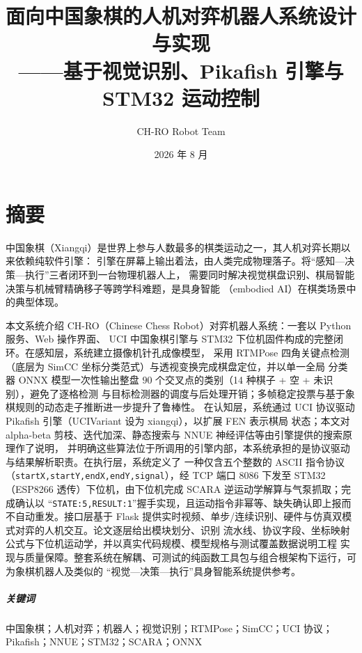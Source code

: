 \documentclass[UTF8, a4paper, 11pt, openany]{ctexbook}
\title{面向中国象棋的人机对弈机器人系统设计与实现\\
\large ——基于视觉识别、Pikafish 引擎与 STM32 运动控制}
\author{CH-RO Robot Team}
\date{2026 年 8 月}
\renewcommand{\_}{\textunderscore\allowbreak}
\begin{document}
\maketitle

\chapter*{摘\quad 要}
中国象棋（Xiangqi）是世界上参与人数最多的棋类运动之一，其人机对弈长期以来依赖纯软件引擎：
引擎在屏幕上输出着法，由人类完成物理落子。将“感知—决策—执行”三者闭环到一台物理机器人上，
需要同时解决视觉棋盘识别、棋局智能决策与机械臂精确移子等跨学科难题，是具身智能
（embodied AI）在棋类场景中的典型体现。

本文系统介绍 CH-RO（Chinese Chess Robot）对弈机器人系统：一套以 Python 服务、Web 操作界面、
UCI 中国象棋引擎与 STM32 下位机固件构成的完整闭环。在感知层，系统建立摄像机针孔成像模型，
采用 RTMPose 四角关键点检测（底层为 SimCC 坐标分类范式）与透视变换完成棋盘定位，并以单一全局
分类器 ONNX 模型一次性输出整盘 $90$ 个交叉点的类别（14 种棋子 + 空 + 未识别），避免了逐格检测
与目标检测器的调度与后处理开销；多帧稳定投票与基于象棋规则的动态走子推断进一步提升了鲁棒性。
在认知层，系统通过 UCI 协议驱动 Pikafish 引擎（UCI\_Variant 设为 xiangqi），以扩展 FEN 表示棋局
状态；本文对 alpha-beta 剪枝、迭代加深、静态搜索与 NNUE 神经评估等由引擎提供的搜索原理作了说明，
并明确这些算法位于所调用的引擎内部，本系统承担的是协议驱动与结果解析职责。在执行层，系统定义了
一种仅含五个整数的 ASCII 指令协议（\texttt{startX,startY,endX,endY,signal}），经 TCP 端口 8086
下发至 STM32（ESP8266 透传）下位机，由下位机完成 SCARA 逆运动学解算与气泵抓取；完成确认以
“\texttt{STATE:5,RESULT:1}”握手实现，且运动指令非幂等、缺失确认即上报而不自动重发。接口层基于
Flask 提供实时视频、单步/连续识别、硬件与仿真双模式对弈的人机交互。论文逐层给出模块划分、识别
流水线、协议字段、坐标映射公式与下位机运动学，并以真实代码规模、模型规格与测试覆盖数据说明工程
实现与质量保障。整套系统在解耦、可测试的纯函数工具包与组合根架构下运行，可为象棋机器人及类似的
“视觉—决策—执行”具身智能系统提供参考。

\paragraph{关键词} 中国象棋；人机对弈；机器人；视觉识别；RTMPose；SimCC；UCI 协议；Pikafish；NNUE；STM32；SCARA；ONNX

\clearpage
\tableofcontents
\clearpage
\listoffigures
\listoftables
\clearpage
\end{document}
